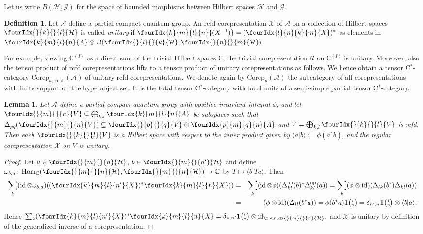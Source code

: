 \documentclass[10pt]{article}
\DeclareMathOperator{\id}{id}
\DeclareMathOperator{\Hom}{Hom}
\DeclareMathOperator{\op}{\mathrm{op}}
\DeclareMathOperator{\rcf}{\mathrm{rcfd}}
\newcommand{\Corep}{\mathrm{Corep}}
\newcommand{\C}{\mathbb{C}}
\newcommand{\Hsp}{\mathcal{H}}
\newcommand{\Grt}[3]{#1{\tiny {\begin{pmatrix} #2\\#3\end{pmatrix}}}}
\newcommand{\UnitC}[2]{\Grt{\mathbf{1}}{#1}{#2}}
\newcommand{\Gr}[5]{\fourIdx{#2}{#4}{#3}{#5}{#1}}%
\newcommand{\Gru}[3]{\Gr{#1}{}{}{#2}{#3}}
\newtheorem{Lem}[Theorem]{Lemma}
\theoremstyle{definition}
\newtheorem{Def}[Theorem]{Definition}
\numberwithin{equation}{section}
\begin{document}
Let us write $B(\Hsp,\mathcal{G})$ for the space of
bounded morphisms between Hilbert spaces $\Hsp$ and $\mathcal{G}$. 

\begin{Def} Let $\mathscr{A}$ define a partial compact quantum
  group. An rcfd corepresentation $\mathscr{X}$ of $\mathscr{A}$ on a collection of Hilbert spaces $\Gru{\Hsp}{k}{l}$ is called
   \emph{unitary}
  if $\Gr{(X^{-1})}{k}{l}{m}{n}=(\Gr{X}{l}{k}{n}{m})^{*}$ as elements in $\Gr{A}{k}{l}{m}{n}\otimes
  B(\Gru{\Hsp}{l}{k},\Gru{\Hsp}{n}{m}).$
\end{Def} 

For example, viewing $\C^{(I)}$ as a direct sum of the trivial Hilbert spaces $\C$, the
  trivial corepresentation $\mathscr{U}$ on $\C^{(I)}$ is unitary. Moreover, also the tensor product of rcfd corepresentations lifts to a tensor product
of unitary corepresentations as follows.  We hence obtain a tensor C$^*$-category $\Corep_{u,\rcf}(\mathscr{A})$ of unitary rcfd corepresentations. We denote again by $\Corep_u(\mathscr{A})$ the subcategory of all corepresentations with finite support on the hyperobject set. It is the total tensor C$^*$-category with local units of a semi-simple partial tensor C$^*$-category.

\begin{Lem} \label{lemma:rep-regular-unitary}
  Let $\mathscr{A}$ define a partial compact quantum group with
positive invariant  integral $\phi$, and let $\Gru{V}{m}{n} \subseteq
\bigoplus_{k,l} \Gr{A}{k}{l}{m}{n}$ be subspaces such that
$\Delta_{pq}(\Gru{V}{m}{n}) \subseteq \Gru{V}{p}{q} \otimes
    \Gr{A}{p}{q}{m}{n}$ and $V=\bigoplus_{k,l} \Gru{V}{k}{l}$ is rcfd. Then each $\Gru{V}{k}{l}$ is a Hilbert space with
    respect to the inner product given by $\langle
    a|b\rangle:=\phi(a^{*}b)$, and the regular corepresentation
    $\mathscr{X}$ on $V$ is unitary.
\end{Lem}
\begin{proof}   Let  $a\in \Gru{\Hsp}{m}{n}$, $b\in \Gru{\Hsp}{m}{n'}$ and define $\omega_{b,a} \colon
\Hom_{\C}(\Gru{\Hsp}{m}{n},\Gru{\Hsp}{m}{n}) \to \C$ by $T
\mapsto \langle b|Ta\rangle$. Then
\begin{eqnarray*}
\sum_{k }(\id \otimes \omega_{b,a})
((\Gr{X}{k}{l}{m}{n'})^* \Gr{X}{k}{l}{m}{n}))  &=& \sum_k
(\id\otimes \phi)(\Delta_{kl}^{\op}(b)^*\Delta_{kl}^{\op}(a))
  = \sum_k (\phi\otimes
  \id)(\Delta_{lk}(b^*)\Delta_{kl}(a)) \\ &=& (\phi\otimes
  \id)(\Delta_{ll}(b^*a))  = \phi(b^*a)\UnitC{l}{n} =
  \delta_{n',n} \UnitC{l}{n} \otimes \langle b|a\rangle.
\end{eqnarray*} Hence $ \sum_{k}
    (\Gr{X}{k}{l}{m}{n'})^* \Gr{X}{k}{l}{m}{n} =
    \delta_{n,n'}\UnitC{l}{n}\otimes
    \id_{\Gru{\Hsp}{m}{n}},$ and $\mathscr{X}$ is unitary by definition of the generalized inverse of a corepresentation.
\end{proof} 
\end{document}
